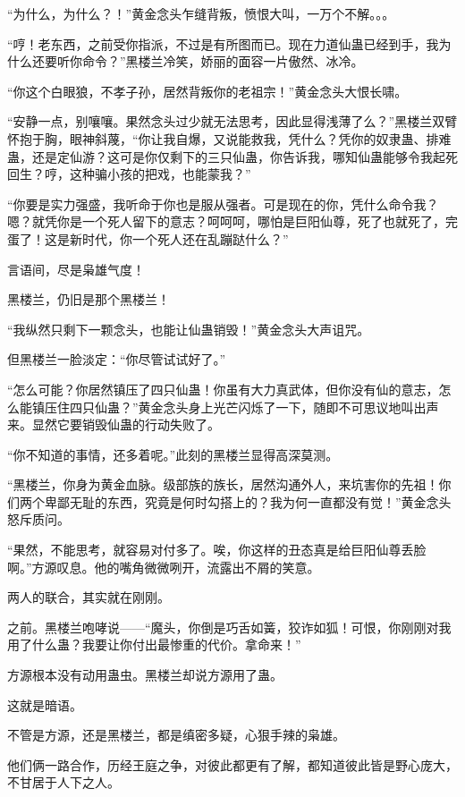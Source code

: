 
\begin{this_body}

“为什么，为什么？！”黄金念头乍缝背叛，愤恨大叫，一万个不解。。。

“哼！老东西，之前受你指派，不过是有所图而已。现在力道仙蛊已经到手，我为什么还要听你命令？”黑楼兰冷笑，娇丽的面容一片傲然、冰冷。

“你这个白眼狼，不孝子孙，居然背叛你的老祖宗！”黄金念头大恨长啸。

“安静一点，别嚷嚷。果然念头过少就无法思考，因此显得浅薄了么？”黑楼兰双臂怀抱于胸，眼神斜蔑，“你让我自爆，又说能救我，凭什么？凭你的奴隶蛊、排难蛊，还是定仙游？这可是你仅剩下的三只仙蛊，你告诉我，哪知仙蛊能够令我起死回生？哼，这种骗小孩的把戏，也能蒙我？”

“你要是实力强盛，我听命于你也是服从强者。可是现在的你，凭什么命令我？嗯？就凭你是一个死人留下的意志？呵呵呵，哪怕是巨阳仙尊，死了也就死了，完蛋了！这是新时代，你一个死人还在乱蹦跶什么？”

言语间，尽是枭雄气度！

黑楼兰，仍旧是那个黑楼兰！

“我纵然只剩下一颗念头，也能让仙蛊销毁！”黄金念头大声诅咒。

但黑楼兰一脸淡定：“你尽管试试好了。”

“怎么可能？你居然镇压了四只仙蛊！你虽有大力真武体，但你没有仙的意志，怎么能镇压住四只仙蛊？”黄金念头身上光芒闪烁了一下，随即不可思议地叫出声来。显然它要销毁仙蛊的行动失败了。

“你不知道的事情，还多着呢。”此刻的黑楼兰显得高深莫测。

“黑楼兰，你身为黄金血脉。级部族的族长，居然沟通外人，来坑害你的先祖！你们两个卑鄙无耻的东西，究竟是何时勾搭上的？我为何一直都没有觉！”黄金念头怒斥质问。

“果然，不能思考，就容易对付多了。唉，你这样的丑态真是给巨阳仙尊丢脸啊。”方源叹息。他的嘴角微微咧开，流露出不屑的笑意。

两人的联合，其实就在刚刚。

之前。黑楼兰咆哮说——“魔头，你倒是巧舌如簧，狡诈如狐！可恨，你刚刚对我用了什么蛊？我要让你付出最惨重的代价。拿命来！”

方源根本没有动用蛊虫。黑楼兰却说方源用了蛊。

这就是暗语。

不管是方源，还是黑楼兰，都是缜密多疑，心狠手辣的枭雄。

他们俩一路合作，历经王庭之争，对彼此都更有了解，都知道彼此皆是野心庞大，不甘居于人下之人。


\end{this_body}
